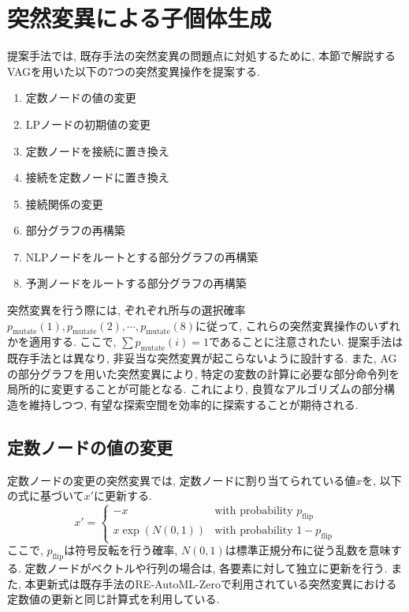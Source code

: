 \documentclass[11pt,oneside,openany,report]{jsbook}
\begin{document}
\section{突然変異による子個体生成}\label{sec:proposed:mutation}

提案手法では, 既存手法の突然変異の問題点に対処するために, 本節で解説するVAGを用いた以下の7つの突然変異操作を提案する.

\begin{enumerate}
  \item 定数ノードの値の変更
  \item LPノードの初期値の変更
  \item 定数ノードを接続に置き換え
  \item 接続を定数ノードに置き換え
  \item 接続関係の変更
  \item 部分グラフの再構築
  \item NLPノードをルートとする部分グラフの再構築
  \item 予測ノードをルートする部分グラフの再構築
\end{enumerate}
\noindent
突然変異を行う際には, ぞれぞれ所与の選択確率$p_{\mathrm{mutate}}(1), p_{\mathrm{mutate}}(2), \cdots, p_{\mathrm{mutate}}(8) $に従って, これらの突然変異操作のいずれかを適用する. ここで, $\sum p_{\mathrm{mutate}}(i) = 1$であることに注意されたい. 提案手法は既存手法とは異なり, 非妥当な突然変異が起こらないように設計する. また, AGの部分グラフを用いた突然変異により, 特定の変数の計算に必要な部分命令列を局所的に変更することが可能となる. これにより, 良質なアルゴリズムの部分構造を維持しつつ, 有望な探索空間を効率的に探索することが期待される.

\subsection{定数ノードの値の変更}
定数ノードの変更の突然変異では, 定数ノードに割り当てられている値$x$を, 以下の式に基づいて$x'$に更新する.
\begin{equation*}
  x' = \begin{cases}
    -x & \text{with probability } p_\mathrm{flip} \\
    x \exp(N(0,1)) & \text{with probability } 1 - p_\mathrm{flip}
  \end{cases}
\end{equation*}
\noindent
ここで, $p_\mathrm{flip}$は符号反転を行う確率, $N(0,1)$は標準正規分布に従う乱数を意味する. 定数ノードがベクトルや行列の場合は, 各要素に対して独立に更新を行う. また, 本更新式は既存手法のRE-AutoML-Zeroで利用されている突然変異における定数値の更新と同じ計算式を利用している.
\end{document}
